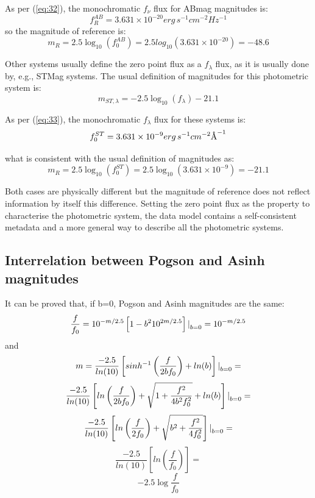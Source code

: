 \documentclass[11pt,a4paper]{ivoa}
\newcommand{\angstrom}{\mbox{\normalfont\AA}}
\begin{document}
\begin{appendices}
As per (\ref{eq:32}), the monochromatic $f_\nu $ flux for ABmag magnitudes is:
\begin{equation} \label{eq:38}
f_{R}^{AB}=3.631 \times 10^{-20} erg\, s^{-1} cm^{-2} Hz^{-1}
\end{equation}
so the magnitude of reference is:
\begin{equation} \label{eq:39}
m_R = 2.5\log_{10} (f_{0}^{AB})=2.5 log_{10}(3.631 \times 10^{-20})=-48.6
\end{equation}

Other systems usually define the zero point flux as a $f_\lambda $ flux, as
it is usually done by, e.g., STMag systems. The usual definition of magnitudes for this photometric system is:
\begin{equation} \label{eq:40}
m_{ST,\lambda }=-2.5\log_{10} (f_\lambda )-21.1
\end{equation}

As per (\ref{eq:33}), the monochromatic
$f_\lambda $ flux for these systems is:
\begin{equation} \label{eq:41}
f_0 ^{ST} = 3.631 \times 10^{-9} erg\, s^{-1} cm^{-2} \angstrom ^{-1}
\end{equation}

what is consistent with the usual definition of magnitudes as:
\begin{equation} \label{eq:42}
m_R =2.5\log_{10} (f_0 ^{ST})=2.5\log_{10} (3.631 \times 10^{-9})=-21.1
\end{equation}
\par
Both cases are physically different but the magnitude of reference does not
reflect information by itself this difference. Setting the zero point flux as the
property to characterise the photometric system, the data model contains a 
self-consistent metadata and a more general way to describe all the photometric
systems.

\subsection{Interrelation between Pogson and Asinh magnitudes}
It can be proved that, if b=0, Pogson and Asinh magnitudes are the same:
\begin{equation} \label{eq:43}
\frac{f}{f_0}=10^{-m/2.5}\left[ 1-b^2 10^{2m/2.5}\right] \text{\textbar}_{b=0} =10^{-m/2.5}
\end{equation}
and
\begin{equation} \label{eq:44}
m=\frac{-2.5}{ln(10)}\left[ sinh^{-1} \left(\frac{f}{2bf_0}\right) + ln(b)\right] \text{\textbar}_{b=0} =
\end{equation}
\[
\frac{-2.5}{ln(10)}\left[ ln\left(\frac{f}{2bf_0}\right) + \sqrt{1+\frac{f^2}{4b^2 f_0^2}} + ln(b)\right] \text{\textbar}_{b=0} =
\]
\[
\frac{-2.5}{ln(10)}\left[ ln\left(\frac{f}{2f_0}\right) + \sqrt{b^2+\frac{f^2}{4 f_0^2}}\right] \text{\textbar}_{b=0} =
\]
\[
\frac{-2.5}{ln(10)}\left[ ln(\frac{f}{f_0}) \right] =
\]
\[
-2.5\log{\frac{f}{f_0}}
\]



\end{appendices}
\end{document}
